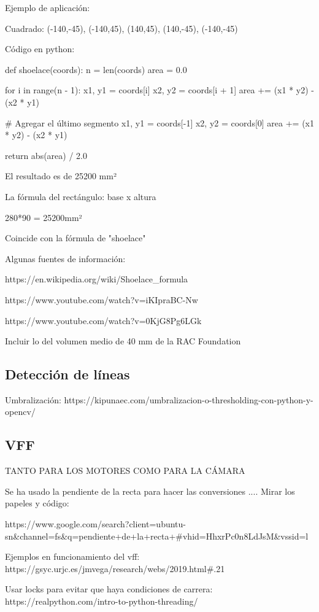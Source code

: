 Ejemplo de aplicación:

Cuadrado: (-140,-45), (-140,45), (140,45), (140,-45), (-140,-45)

Código en python:

def shoelace(coords):
n = len(coords)
area = 0.0

for i in range(n - 1):
x1, y1 = coords[i]
x2, y2 = coords[i + 1]
area += (x1 * y2) - (x2 * y1)

\# Agregar el último segmento
x1, y1 = coords[-1]
x2, y2 = coords[0]
area += (x1 * y2) - (x2 * y1)

return abs(area) / 2.0

El resultado es de 25200 mm²

La fórmula del rectángulo: base x altura

280*90 = 25200mm²

Coincide con la fórmula de "shoelace"

Algunas fuentes de información:

https://en.wikipedia.org/wiki/Shoelace\_formula

https://www.youtube.com/watch?v=iKIpraBC-Nw

https://www.youtube.com/watch?v=0KjG8Pg6LGk


Incluir lo del volumen medio de 40 mm de la RAC Foundation


\subsection{Detección de líneas}
\label{subsec:softwaredl}

Umbralización:  https://kipunaec.com/umbralizacion-o-thresholding-con-python-y-opencv/


\subsection{VFF}
\label{subsec:softwarevff}

TANTO PARA LOS MOTORES COMO PARA LA CÁMARA

Se ha usado la pendiente de la recta para hacer las conversiones .... Mirar los papeles y código: 

https://www.google.com/search?client=ubuntu-sn\&channel=fs\&q=pendiente+de+la+recta+\#vhid=HhxrPc0n8LdJsM\&vssid=l

Ejemplos en funcionamiento del vff:
https://gsyc.urjc.es/jmvega/research/webs/2019.html\#.21


Usar locks para evitar que haya condiciones de carrera: https://realpython.com/intro-to-python-threading/



